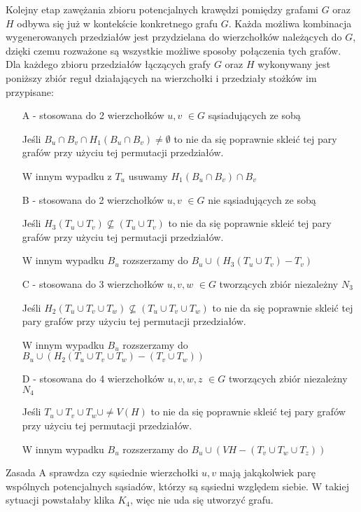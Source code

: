 Kolejny etap zawężania zbioru potencjalnych krawędzi pomiędzy grafami $G$ oraz $H$ odbywa się już w kontekście konkretnego grafu $G$. Każda możliwa kombinacja wygenerowanych przedziałów jest  przydzielana do wierzchołków należących do $G$, dzięki czemu rozważone są wszystkie możliwe sposoby połączenia tych grafów. Dla każdego zbioru przedziałów łączących grafy $G$ oraz $H$ wykonywany jest poniższy zbiór reguł działających na wierzchołki i przedziały stożków im przypisane:
\begin{itemize}
  \item[A] - stosowana do 2 wierzchołków $u,v$ $\in G$ sąsiadujących ze sobą 
  
  Jeśli $B_u \cap B_v \cap H_1(B_u \cap B_v) \neq \emptyset $ to nie da się 
  poprawnie skleić tej pary grafów przy użyciu tej permutacji przedziałów.
  
  W innym wypadku z $T_u$ usuwamy $H_1(B_u \cap B_v) \cap B_v $  
  \item[B] - stosowana do 2 wierzchołków $u,v$ $\in G$ nie sąsiadujących ze sobą 
  
  Jeśli $H_3(T_u \cup T_v) \not\subseteq (T_u \cup T_v)$ to nie da się poprawnie skleić tej pary grafów przy użyciu tej permutacji przedziałów.
  
  W innym wypadku $B_u$ rozszerzamy do $B_u \cup (H_3(T_u \cup T_v) - T_v)$
  \item[C] - stosowana do 3 wierzchołków $u,v,w$ $\in G$ tworzących zbiór niezależny $N_3$ 
  
  Jeśli $H_2(T_u \cup T_v \cup T_w) \not\subseteq (T_u \cup T_v \cup T_w)$ 
  to nie da się poprawnie skleić tej pary grafów przy użyciu tej permutacji przedziałów. 
  
  W innym wypadku $B_u$ rozszerzamy do $B_u \cup (H_2(T_u \cup T_v \cup T_w) - (T_v \cup T_w))$
  \item[D] - stosowana do 4 wierzchołków $u,v,w,z$ $\in G$ tworzących zbiór niezależny $N_4$  
  
  Jeśli $T_u \cup T_v \cup T_w \cup \neq V(H) $ to nie da się poprawnie skleić tej pary grafów przy użyciu tej permutacji przedziałów.
  
  W innym wypadku $B_u$ rozszerzamy do $B_u \cup (VH - (T_v \cup T_w \cup T_z))$
\end{itemize}

Zasada A sprawdza czy sąsiednie wierzchołki $u, v$ mają jakąkolwiek parę wspólnych potencjalnych sąsiadów, którzy są sąsiedni względem siebie.
W takiej sytuacji powstałaby klika $K_4$, więc nie uda się utworzyć grafu. \par

